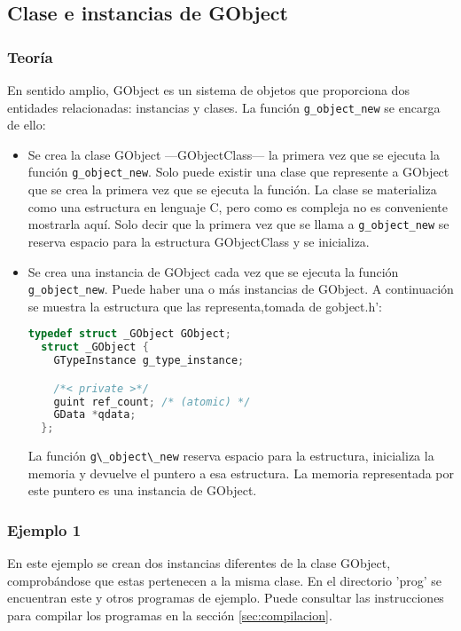 \subsection{Clase e instancias de \textsf{GObject}} \label{subsec:clase_instancias_gobject}

\subsubsection{Teoría}
En sentido amplio, \textsf{GObject} es un sistema de objetos que proporciona dos entidades relacionadas: instancias y clases. La función \texttt{g\_object\_new} se
encarga de ello:
\begin{itemize}
  \tightlist
\item Se crea la clase \textsf{GObject} ---\textsf{GObjectClass}--- la primera vez que
  se ejecuta la función \texttt{g\_object\_new}. Solo puede existir una clase que
  represente a \textsf{GObject} que se crea la primera vez que se ejecuta la función.
  La clase se materializa como una estructura en lenguaje C, pero como es compleja no es
  conveniente mostrarla aquí. Solo decir que la primera vez que se llama a \texttt{g\_object\_new} se reserva espacio para la estructura \textsf{GObjectClass} y se
  inicializa.
\item Se crea una instancia de \textsf{GObject} cada vez que se ejecuta la función
  \texttt{g\_object\_new}. Puede haber una o más instancias de \textsf{GObject}.
  A continuación se muestra la estructura que las representa,tomada de \textsf{gobject.h}':
\begin{lstlisting}[language=C]
  typedef struct _GObject GObject;
  struct _GObject {
    GTypeInstance g_type_instance;

    /*< private >*/
    guint ref_count; /* (atomic) */
    GData *qdata;
  };
\end{lstlisting}
La función \passthrough{\lstinline!g\_object\_new!} reserva espacio para la estructura,
inicializa la memoria y devuelve el puntero a esa estructura. La memoria representada por este puntero es una instancia de \textsf{GObject}.
\end{itemize}

\subsubsection{Ejemplo 1}
En este ejemplo se crean dos instancias diferentes de la clase \textsf{GObject}, comprobándose que estas pertenecen a la misma clase. En el directorio '\textsf{prog}' se
encuentran este y otros programas de ejemplo. Puede consultar las instrucciones para
compilar los programas en la sección \ref{sec:compilacion}.

